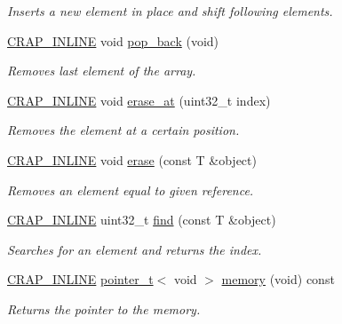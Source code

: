 \begin{DoxyCompactItemize}
\begin{DoxyCompactList}\small\item\em Inserts a new element in place and shift following elements. \end{DoxyCompactList}\item 
\hyperlink{config__x86_8h_a5a40526b8d842e7ff731509998bb0f1c}{C\+R\+A\+P\+\_\+\+I\+N\+L\+I\+N\+E} void \hyperlink{classcrap_1_1sorted__array_a0dcea6e2e1958df560c4277c68d56173}{pop\+\_\+back} (void)
\begin{DoxyCompactList}\small\item\em Removes last element of the array. \end{DoxyCompactList}\item 
\hyperlink{config__x86_8h_a5a40526b8d842e7ff731509998bb0f1c}{C\+R\+A\+P\+\_\+\+I\+N\+L\+I\+N\+E} void \hyperlink{classcrap_1_1sorted__array_a5ad794c314b02288f6c4e727f6ed5dd6}{erase\+\_\+at} (uint32\+\_\+t index)
\begin{DoxyCompactList}\small\item\em Removes the element at a certain position. \end{DoxyCompactList}\item 
\hyperlink{config__x86_8h_a5a40526b8d842e7ff731509998bb0f1c}{C\+R\+A\+P\+\_\+\+I\+N\+L\+I\+N\+E} void \hyperlink{classcrap_1_1sorted__array_a515100392a0ff72425b6ff30d476df55}{erase} (const T \&object)
\begin{DoxyCompactList}\small\item\em Removes an element equal to given reference. \end{DoxyCompactList}\item 
\hyperlink{config__x86_8h_a5a40526b8d842e7ff731509998bb0f1c}{C\+R\+A\+P\+\_\+\+I\+N\+L\+I\+N\+E} uint32\+\_\+t \hyperlink{classcrap_1_1sorted__array_aca7ebbadcad54d26b850e6dffd8d5400}{find} (const T \&object)
\begin{DoxyCompactList}\small\item\em Searches for an element and returns the index. \end{DoxyCompactList}\item 
\hyperlink{config__x86_8h_a5a40526b8d842e7ff731509998bb0f1c}{C\+R\+A\+P\+\_\+\+I\+N\+L\+I\+N\+E} \hyperlink{structcrap_1_1pointer__t}{pointer\+\_\+t}$<$ void $>$ \hyperlink{classcrap_1_1sorted__array_a924b156d8b1da6c5a240d9a8ae78db4a}{memory} (void) const 
\begin{DoxyCompactList}\small\item\em Returns the pointer to the memory. \end{DoxyCompactList}\end{DoxyCompactItemize}

